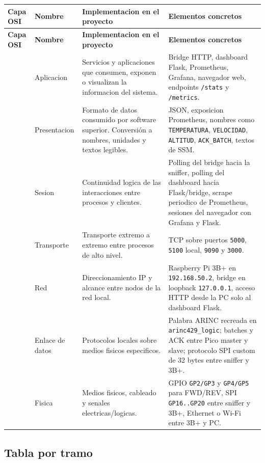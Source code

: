 \documentclass[12pt,a4paper]{article}
\begin{document}
\renewcommand{\arraystretch}{1.25}
\begin{longtable}{>{\raggedright\arraybackslash}p{1.5cm} >{\raggedright\arraybackslash}p{3.3cm} >{\raggedright\arraybackslash}p{4.8cm} >{\raggedright\arraybackslash}p{5.1cm}}
\toprule
\textbf{Capa OSI} & \textbf{Nombre} & \textbf{Implementacion en el proyecto} & \textbf{Elementos concretos} \\
\midrule
\endfirsthead
\toprule
\textbf{Capa OSI} & \textbf{Nombre} & \textbf{Implementacion en el proyecto} & \textbf{Elementos concretos} \\
\midrule
\endhead
7 & Aplicacion & Servicios y aplicaciones que consumen, exponen o visualizan la informacion del sistema. & Bridge HTTP, dashboard Flask, Prometheus, Grafana, navegador web, endpoints \texttt{/stats} y \texttt{/metrics}. \\
\midrule
6 & Presentacion & Formato de datos consumido por software superior. Conversión a nombres, unidades y textos legibles. & JSON, exposicion Prometheus, nombres como \texttt{TEMPERATURA}, \texttt{VELOCIDAD}, \texttt{ALTITUD}, \texttt{ACK\_BATCH}, textos de SSM. \\
\midrule
5 & Sesion & Continuidad logica de las interacciones entre procesos y clientes. & Polling del bridge hacia la sniffer, polling del dashboard hacia Flask/bridge, scrape periodico de Prometheus, sesiones del navegador con Grafana y Flask. \\
\midrule
4 & Transporte & Transporte extremo a extremo entre procesos de alto nivel. & TCP sobre puertos \texttt{5000}, \texttt{5100} local, \texttt{9090} y \texttt{3000}. \\
\midrule
3 & Red & Direccionamiento IP y alcance entre nodos de la red local. & Raspberry Pi 3B+ en \texttt{192.168.50.2}, bridge en loopback \texttt{127.0.0.1}, acceso HTTP desde la PC solo al dashboard Flask. \\
\midrule
2 & Enlace de datos & Protocolos locales sobre medios fisicos especificos. & Palabra ARINC recreada en \texttt{arinc429\_logic}; batches y ACK entre Pico master y slave; protocolo SPI custom de 32 bytes entre sniffer y 3B+. \\
\midrule
1 & Fisica & Medios fisicos, cableado y senales electricas/logicas. & GPIO \texttt{GP2/GP3} y \texttt{GP4/GP5} para FWD/REV, SPI \texttt{GP16..GP20} entre sniffer y 3B+, Ethernet o Wi-Fi entre 3B+ y PC. \\
\bottomrule
\end{longtable}

\subsection*{Tabla por tramo}
\end{document}
